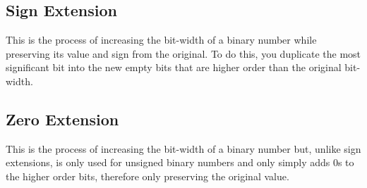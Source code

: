 \documentclass{article}
\begin{document}
\subsection{Sign Extension}
\qquad
This is the process of increasing the bit-width of a binary number while preserving its value and sign from the original. To do this, you duplicate the most significant bit into the new empty bits that are higher order than the original bit-width.

\subsection{Zero Extension}
\qquad
This is the process of increasing the bit-width of a binary number but, unlike sign extensions, is only used for unsigned binary numbers and only simply adds 0s to the higher order bits, therefore only preserving the original value.
\end{document}
